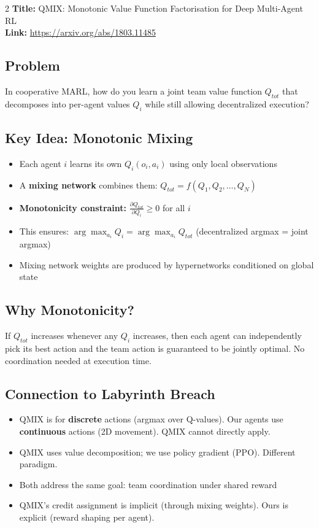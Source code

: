 \documentclass[10pt,a4paper]{article}
\begin{document}
\begin{multicols}{2}
\textbf{Title:} QMIX: Monotonic Value Function Factorisation for Deep Multi-Agent RL \\
\textbf{Link:} \url{https://arxiv.org/abs/1803.11485}

\subsection{Problem}
In cooperative MARL, how do you learn a joint team value function $Q_{tot}$ that decomposes into per-agent values $Q_i$ while still allowing decentralized execution?

\subsection{Key Idea: Monotonic Mixing}
\begin{itemize}
\item Each agent $i$ learns its own $Q_i(o_i, a_i)$ using only local observations
\item A \textbf{mixing network} combines them: $Q_{tot} = f(Q_1, Q_2, \ldots, Q_N)$
\item \textbf{Monotonicity constraint:} $\frac{\partial Q_{tot}}{\partial Q_i} \geq 0$ for all $i$
\item This ensures: $\arg\max_{a_i} Q_i = \arg\max_{a_i} Q_{tot}$ (decentralized argmax = joint argmax)
\item Mixing network weights are produced by hypernetworks conditioned on global state
\end{itemize}

\subsection{Why Monotonicity?}
If $Q_{tot}$ increases whenever any $Q_i$ increases, then each agent can independently pick its best action and the team action is guaranteed to be jointly optimal. No coordination needed at execution time.

\subsection{Connection to Labyrinth Breach}
\begin{itemize}
\item QMIX is for \textbf{discrete} actions (argmax over Q-values). Our agents use \textbf{continuous} actions (2D movement). QMIX cannot directly apply.
\item QMIX uses value decomposition; we use policy gradient (PPO). Different paradigm.
\item Both address the same goal: team coordination under shared reward
\item QMIX's credit assignment is implicit (through mixing weights). Ours is explicit (reward shaping per agent).
\end{itemize}


\end{multicols}
\end{document}
